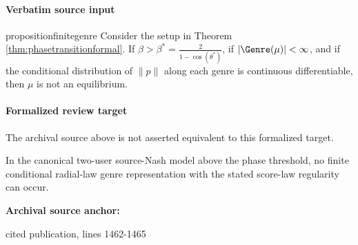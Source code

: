 \documentclass[10pt]{article}
\begin{document}
\paragraph{Verbatim source input}
\begin{ReviewVerbatim}
\begin{restatable}{proposition}{finitegenre}
\label{prop:finitegenre}
Consider the setup in Theorem \ref{thm:phasetransitionformal}. If $\beta > \beta^* = \frac{2}{1 - \cos(\theta^*)}$, if $|\Genre(\mu)| < \infty$, and if the conditional distribution of $\|p\|$ along each genre is continuous differentiable, then $\mu$ is not an equilibrium.
\end{restatable}
\end{ReviewVerbatim}


\paragraph{Formalized review target}
The archival source above is not asserted equivalent to this formalized target.
\begin{ReviewVerbatim}
In the canonical two-user source-Nash model above the phase threshold, no finite conditional radial-law genre representation with the stated score-law regularity can occur.
\end{ReviewVerbatim}

\textbf{Archival source anchor:} {\footnotesize\raggedright cited publication, lines 1462-\allowbreak{}1465\par}
\end{document}
